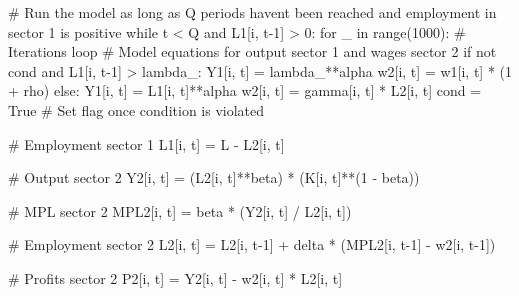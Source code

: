 \documentclass[
  letterpaper,
  DIV=11,
  numbers=noendperiod]{scrreprt}
\newenvironment{Shaded}{\begin{snugshade}}{\end{snugshade}}
\newcommand{\BuiltInTok}[1]{\textcolor[rgb]{0.00,0.23,0.31}{#1}}
\newcommand{\CommentTok}[1]{\textcolor[rgb]{0.37,0.37,0.37}{#1}}
\newcommand{\ControlFlowTok}[1]{\textcolor[rgb]{0.00,0.23,0.31}{#1}}
\newcommand{\DecValTok}[1]{\textcolor[rgb]{0.68,0.00,0.00}{#1}}
\newcommand{\KeywordTok}[1]{\textcolor[rgb]{0.00,0.23,0.31}{#1}}
\newcommand{\NormalTok}[1]{\textcolor[rgb]{0.00,0.23,0.31}{#1}}
\newcommand{\OperatorTok}[1]{\textcolor[rgb]{0.37,0.37,0.37}{#1}}
\newcommand{\VariableTok}[1]{\textcolor[rgb]{0.07,0.07,0.07}{#1}}
\begin{document}
\begin{tcolorbox}
\begin{Shaded}
\begin{Highlighting}[]
    \CommentTok{\# Run the model as long as Q periods haven\textquotesingle{}t been reached and employment in sector 1 is positive}
    \ControlFlowTok{while}\NormalTok{ t }\OperatorTok{\textless{}}\NormalTok{ Q }\KeywordTok{and}\NormalTok{ L1[i, t}\OperatorTok{{-}}\DecValTok{1}\NormalTok{] }\OperatorTok{\textgreater{}} \DecValTok{0}\NormalTok{:}
        \ControlFlowTok{for}\NormalTok{ \_ }\KeywordTok{in} \BuiltInTok{range}\NormalTok{(}\DecValTok{1000}\NormalTok{):  }\CommentTok{\# Iterations loop}
            \CommentTok{\# Model equations for output sector 1 and wages sector 2}
            \ControlFlowTok{if} \KeywordTok{not}\NormalTok{ cond }\KeywordTok{and}\NormalTok{ L1[i, t}\OperatorTok{{-}}\DecValTok{1}\NormalTok{] }\OperatorTok{\textgreater{}}\NormalTok{ lambda\_:}
\NormalTok{                Y1[i, t] }\OperatorTok{=}\NormalTok{ lambda\_}\OperatorTok{**}\NormalTok{alpha}
\NormalTok{                w2[i, t] }\OperatorTok{=}\NormalTok{ w1[i, t] }\OperatorTok{*}\NormalTok{ (}\DecValTok{1} \OperatorTok{+}\NormalTok{ rho)}
            \ControlFlowTok{else}\NormalTok{:}
\NormalTok{                Y1[i, t] }\OperatorTok{=}\NormalTok{ L1[i, t]}\OperatorTok{**}\NormalTok{alpha}
\NormalTok{                w2[i, t] }\OperatorTok{=}\NormalTok{ gamma[i, t] }\OperatorTok{*}\NormalTok{ L2[i, t]}
\NormalTok{                cond }\OperatorTok{=} \VariableTok{True}  \CommentTok{\# Set flag once condition is violated}

            \CommentTok{\# Employment sector 1}
\NormalTok{            L1[i, t] }\OperatorTok{=}\NormalTok{ L }\OperatorTok{{-}}\NormalTok{ L2[i, t]}

            \CommentTok{\# Output sector 2}
\NormalTok{            Y2[i, t] }\OperatorTok{=}\NormalTok{ (L2[i, t]}\OperatorTok{**}\NormalTok{beta) }\OperatorTok{*}\NormalTok{ (K[i, t]}\OperatorTok{**}\NormalTok{(}\DecValTok{1} \OperatorTok{{-}}\NormalTok{ beta))}

            \CommentTok{\# MPL sector 2}
\NormalTok{            MPL2[i, t] }\OperatorTok{=}\NormalTok{ beta }\OperatorTok{*}\NormalTok{ (Y2[i, t] }\OperatorTok{/}\NormalTok{ L2[i, t])}

            \CommentTok{\# Employment sector 2}
\NormalTok{            L2[i, t] }\OperatorTok{=}\NormalTok{ L2[i, t}\OperatorTok{{-}}\DecValTok{1}\NormalTok{] }\OperatorTok{+}\NormalTok{ delta }\OperatorTok{*}\NormalTok{ (MPL2[i, t}\OperatorTok{{-}}\DecValTok{1}\NormalTok{] }\OperatorTok{{-}}\NormalTok{ w2[i, t}\OperatorTok{{-}}\DecValTok{1}\NormalTok{])}

            \CommentTok{\# Profits sector 2}
\NormalTok{            P2[i, t] }\OperatorTok{=}\NormalTok{ Y2[i, t] }\OperatorTok{{-}}\NormalTok{ w2[i, t] }\OperatorTok{*}\NormalTok{ L2[i, t]}


\end{Highlighting}
\end{Shaded}
\end{tcolorbox}
\end{document}
